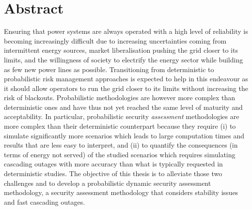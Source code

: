 \addtocounter{page}{-1}
\chapter*{Abstract}

Ensuring that power systems are always operated with a high level of reliability is becoming increasingly difficult due to increasing uncertainties coming from intermittent energy sources, market liberalisation pushing the grid closer to its limits, and the willingness of society to electrify the energy sector while building as few new power lines as possible. Transitioning from deterministic to probabilistic risk management approaches is expected to help in this endeavour as it should allow operators to run the grid closer to its limits without increasing the risk of blackouts. Probabilistic methodologies are however more complex than deterministic ones and have thus not yet reached the same level of maturity and acceptability. In particular, probabilistic security \emph{assessment} methodologies are more complex than their deterministic counterpart because they require (i) to simulate significantly more scenarios which leads to large computation times and results that are less easy to interpret, and (ii) to quantify the consequences (\eg in terms of energy not served) of the studied scenarios which requires simulating cascading outages with more accuracy than what is typically requested in deterministic studies. The objective of this thesis is to alleviate those two challenges and to develop a probabilistic dynamic security assessment methodology, \ie a security assessment methodology that considers stability issues and fast cascading outages.

